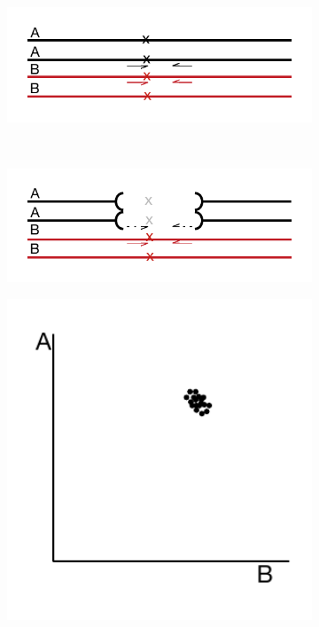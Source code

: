 \begin{figure}
    \centering
    \begin{subfigure}[b]{0.45\textwidth}
        \caption{}
        \centering
        \includegraphics[width=1\textwidth]{PolyMarker/Figures/deletions/wt.pdf}
        \label{fig:poly:wt}
    \end{subfigure}
    ~
     \begin{subfigure}[b]{0.45\textwidth}
        \caption{}
        \centering
        \includegraphics[width=1\textwidth]{PolyMarker/Figures/deletions/homM4.pdf}
        \label{fig:poly:homM4}
    \end{subfigure}
    \begin{subfigure}[b]{0.3\textwidth}
        \caption{}
        \centering
        \includegraphics[width=1\textwidth]{PolyMarker/Figures/deletions/homFalse.pdf}

\end{subfigure}
\end{figure}
